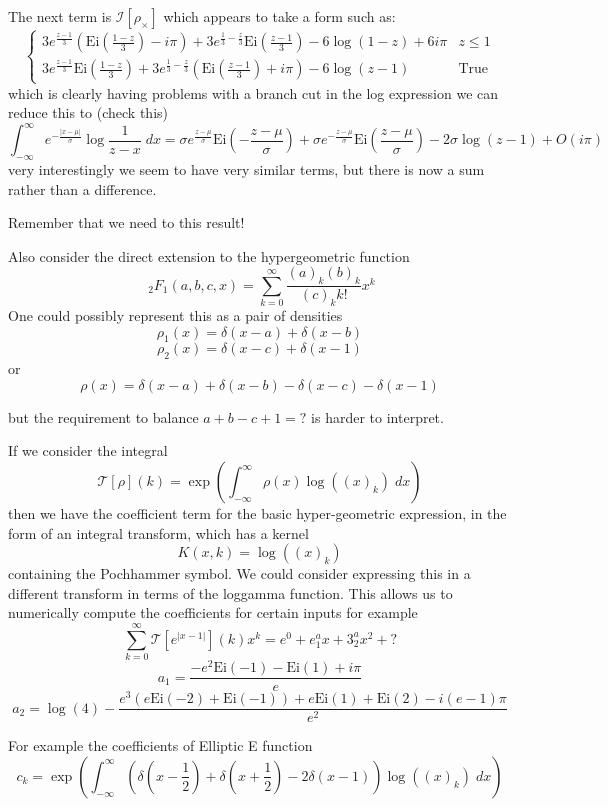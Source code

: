 \documentclass{article}
\begin{document}
The next term is $\mathcal{I}[\rho_\times]$ which appears to take a form such as:
$$
\begin{cases}
                    3 e^{\frac{z-1}{3}} \left(\text{Ei}\left(\frac{1-z}{3}\right)-i \pi \right)+3 e^{\frac{1}{3}-\frac{z}{3}} \text{Ei}\left(\frac{z-1}{3}\right)-6 \log (1-z)+6 i \pi  & z\leq 1 \\
                    3 e^{\frac{z-1}{3}} \text{Ei}\left(\frac{1-z}{3}\right)+3 e^{\frac{1}{3}-\frac{z}{3}} \left(\text{Ei}\left(\frac{z-1}{3}\right)+i \pi \right)-6 \log (z-1) & \text{True}
                   \end{cases}
$$
which is clearly having problems with a branch cut in the log expression we can reduce this to (check this)
$$
\int_{-\infty}^\infty e^{-\frac{|x-\mu|}{\sigma}} \log\frac{1}{z-x} \; dx = \sigma e^{\frac{z-\mu}{\sigma}} \text{Ei}\left(-\frac{z-\mu}{\sigma}\right)+\sigma e^{- \frac{z-\mu}{\sigma}} \text{Ei}\left(\frac{z-\mu}{\sigma}\right)- 2 \sigma \log (z-1) + O(i \pi)
$$
very interestingly we seem to have very similar terms, but there is now a sum rather than a difference.

Remember that we need to  this result!



Also consider the direct extension to the hypergeometric function
$$
\;_2F_1(a,b,c,x) = \sum_{k=0}^\infty \frac{(a)_k(b)_k}{(c)_k k!} x^k
$$
One could possibly represent this as a pair of densities
$$
\rho_1(x) = \delta(x-a) + \delta(x-b)
$$
$$
\rho_2(x) = \delta(x-c) + \delta(x-1)
$$
or
$$
\rho(x) = \delta(x-a) + \delta(x-b) -  \delta(x-c) - \delta(x-1)
$$

but the requirement to balance $a+b-c+1=?$ is harder to interpret.

If we consider the integral 
$$
\mathcal{T}[\rho](k) = \exp\left(\int_{-\infty}^\infty \rho(x) \log((x)_k) \; dx \right)
$$
then we have the coefficient term for the basic hyper-geometric expression, in the form of an integral transform, which has a kernel
$$
K(x,k) = \log((x)_k)
$$
containing the Pochhammer symbol. We could consider expressing this in a different transform in terms of the loggamma function. This allows us to numerically compute the coefficients for certain inputs for example
$$
\sum_{k=0}^\infty \mathcal{T}[e^{|x-1|}](k) x^k = e^0 + e^a_1 x + 3^a_2 x^2 + ?
$$
$$
a_1 = \frac{-e^2 \text{Ei}(-1)-\text{Ei}(1)+i \pi }{e}
$$
$$
a_2 =  \log (4)-\frac{e^3 (e \text{Ei}(-2)+\text{Ei}(-1))+e
    \text{Ei}(1)+\text{Ei}(2)-i (e-1) \pi }{e^2}
$$

For example the coefficients of Elliptic E function 
$$
c_k = \exp\left(\int_{-\infty}^\infty (\delta(x-\frac{1}{2}) + \delta(x+\frac{1}{2})-2\delta(x-1)) \log((x)_k) \; dx \right)
$$
\end{document}
